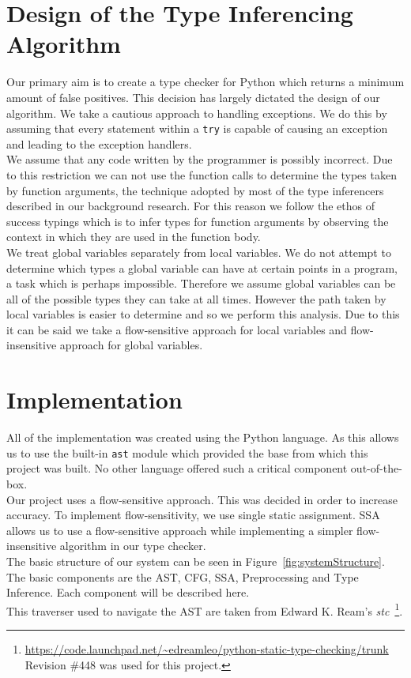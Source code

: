 \documentclass[12pt, titlepage]{article}
\begin{document}
\section{Design of the Type Inferencing Algorithm}
Our primary aim is to create a type checker for Python which returns a minimum amount of false positives. This decision has largely dictated the design of our algorithm. We take a cautious approach to handling exceptions. We do this by assuming that every statement within a \texttt{try} is capable of causing an exception and leading to the exception handlers. \\
\indent We assume that any code written by the programmer is possibly incorrect. Due to this restriction we can not use the function calls to determine the types taken by function arguments, the technique adopted by most of the type inferencers described in our background research. For this reason we follow the ethos of success typings which is to infer types for function arguments by observing the context in which they are used in the function body. \\
\indent We treat global variables separately from local variables. We do not attempt to determine which types a global variable can have at certain points in a program, a task which is perhaps impossible. Therefore we assume global variables can be all of the possible types they can take at all times. However the path taken by local variables is easier to determine and so we perform this analysis. Due to this it can be said we take a flow-sensitive approach for local variables and flow-insensitive approach for global variables.



\newpage
\section{Implementation}
All of the implementation was created using the Python language. As this allows us to use the built-in \texttt{ast} module which provided the base from which this project was built. No other language offered such a critical component out-of-the-box. \\
\indent Our project uses a flow-sensitive approach. This was decided in order to increase accuracy. To implement flow-sensitivity, we use single static assignment. SSA allows us to use a flow-sensitive approach while implementing a simpler flow-insensitive algorithm in our type checker. \\
\indent The basic structure of our system can be seen in Figure~\ref{fig:systemStructure}. The basic components are the AST, CFG, SSA, Preprocessing and Type Inference. Each component will be described here. \\
\indent This traverser used to navigate the AST are taken from Edward K. Ream's \textit{stc}~\footnote{\url{https://code.launchpad.net/~edreamleo/python-static-type-checking/trunk} Revision \#448 was used for this project.}.
\end{document}

